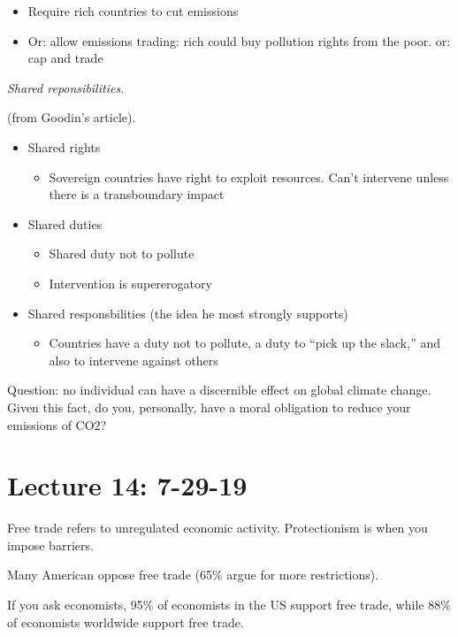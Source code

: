 \documentclass{article}
\begin{document}
  \begin{itemize}
    \item Require rich countries to cut emissions
    \item Or: allow emissions trading: rich could buy pollution rights from the poor.  or: cap and trade
  \end{itemize}

  {\it Shared reponsibilities.}

  (from Goodin's article).

  \begin{itemize}
    \item Shared rights
      \begin{itemize}
        \item Sovereign countries have right to exploit resources.  Can't intervene unless there is a transboundary impact
      \end{itemize}
    \item Shared duties
      \begin{itemize}
        \item Shared duty not to pollute
        \item Intervention is supererogatory
      \end{itemize}
    \item Shared responsbilities (the idea he most strongly supports)
      \begin{itemize}
        \item Countries have a duty not to pollute, a duty to ``pick up the slack,'' and also to intervene against others
      \end{itemize}
  \end{itemize}

  Question: no individual can have a discernible effect on global climate change.  Given this fact, do you, personally, have a moral obligation to reduce your emissions of CO2?

  \section{Lecture 14: 7-29-19}

  Free trade refers to unregulated economic activity.  Protectionism is when you impose barriers.

  Many American oppose free trade (65\% argue for more restrictions).

  If you ask economists, 95\% of economists in the US support free trade, while 88\% of economists worldwide support free trade.
\end{document}
